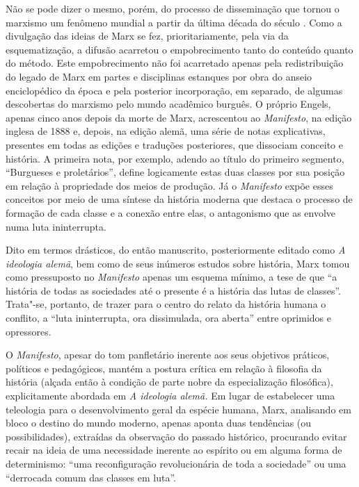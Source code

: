 Não se pode dizer o mesmo, porém, do processo de disseminação que tornou
o marxismo um fenômeno mundial a partir da última década do século .
Como a divulgação das ideias de Marx se fez, prioritariamente, pela via da
esquematização, a difusão acarretou o empobrecimento tanto do conteúdo
quanto do método. Este empobrecimento não foi acarretado apenas pela
redistribuição do legado de Marx em partes e disciplinas estanques por
obra do anseio enciclopédico da época e pela posterior incorporação, em
separado, de algumas descobertas do marxismo pelo mundo acadêmico
burguês. O próprio Engels, apenas cinco anos depois da morte de Marx,
acrescentou ao \textit{Manifesto}, na edição inglesa de 1888 e, depois,
na edição alemã, uma série de notas explicativas, presentes em todas as
edições e traduções posteriores, que dissociam conceito e história. A
primeira nota, por exemplo, adendo ao título do primeiro segmento,
“Burgueses e proletários”, define logicamente estas duas classes por
sua posição em relação à propriedade dos meios de produção. Já o
\textit{Manifesto} expõe esses conceitos por meio de uma síntese da
história moderna que destaca o processo de formação de cada classe e a
conexão entre elas, o antagonismo que as envolve numa luta
ininterrupta.

Dito em termos drásticos, do então manuscrito, posteriormente editado
como \textit{A ideologia alemã}, bem como de seus inúmeros estudos
sobre história, Marx tomou como pressuposto no \textit{Manifesto}
apenas um esquema mínimo, a tese de que “a história de todas as
sociedades até o presente é a história das lutas de classes”.
Trata"-se, portanto, de trazer para o centro do relato da história
humana o conflito, a “luta ininterrupta, ora dissimulada, ora aberta”
entre oprimidos e opressores.

O \textit{Manifesto}, apesar do tom panfletário inerente aos seus
objetivos práticos, políticos e pedagógicos, mantém a postura crítica
em relação à filosofia da história (alçada então à condição de parte
nobre da especialização filosófica), explicitamente abordada em
\textit{A ideologia alemã.} Em lugar de estabelecer uma teleologia para
o desenvolvimento geral da espécie humana, Marx, analisando em bloco o
destino do mundo moderno, apenas aponta duas tendências (ou
possibilidades), extraídas da observação do passado histórico,
procurando evitar recair na ideia de uma necessidade inerente ao
espírito ou em alguma forma de determinismo: “uma reconfiguração
revolucionária de toda a sociedade” ou uma “derrocada comum das classes
em luta”.

